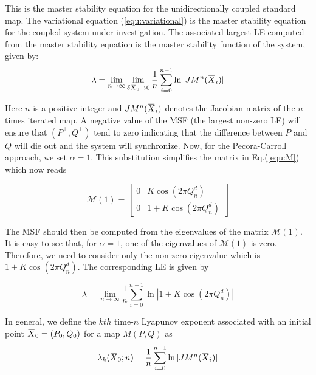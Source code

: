\documentclass[preprint,showpacs,preprintnumbers,amsmath,amssymb]{revtex4-1}
\newcommand{\overbar}[1]{\mkern 1.5mu\overline{\mkern-1.5mu#1\mkern-1.5mu}\mkern 1.5mu}
\begin{document}
This is the master stability equation for the unidirectionally coupled standard map. The variational equation (\ref{equ:variational}) is the master stability equation for the coupled system under investigation. The associated largest LE computed from the master stability equation is the master stability function of the system, given by:
\begin{equation}
\label{equ:msf}
\lambda  = \lim_{n \rightarrow \infty} \lim_{\delta\overbar{X}_0\rightarrow 0}\frac{1}{n}\sum^{n-1}_{i=0}\ln|JM^n(\overbar{X}_i)|
\end{equation}

Here $n$ is a positive integer and $JM^n(\overbar{X}_i)$ denotes the Jacobian matrix of the $n$-times iterated map.  A negative value of the MSF (the largest non-zero LE) will ensure that $(P^\perp,Q^\perp) $ tend to zero indicating that the difference between $P$ and $Q$ will die out and the system will synchronize. 
Now, for the Pecora-Carroll approach, we set $\alpha = 1$. This substitution simplifies the matrix in Eq.(\ref{equ:M}) which now reads

\begin{equation} 
\mathcal{M}(1)= \begin{bmatrix} 0 & K\cos(2\pi Q^d_n) \\ 0 & 1 + K\cos(2\pi Q^d_n) \end{bmatrix} 
\end{equation}

The MSF should then be computed from the eigenvalues of the matrix $\mathcal{M}(1)$. It is easy to see that, for $\alpha =1$, one of the eigenvalues of   $\mathcal{M}(1)$ is zero. Therefore, we need to consider only the non-zero eigenvalue which is $1+K\cos(2\pi Q^d_n)$. The corresponding LE is given by

\begin{equation}
\label{equ:LE}
\lambda   = \lim_{n \rightarrow \infty} \frac{1}{n}\sum^{n-1}_{i=0}\ln|1+K\cos(2\pi Q^d_n)|
\end{equation}

In general, we define the $kth$ time-$n$ Lyapunov exponent associated with an initial point $\overbar{X}_0 = (P_0,Q_0)$ for a map $M(P,Q)$ as
\begin{equation}
\label{equ:FLEf}
\lambda _k(\overbar{X}_0;n)  = \frac{1}{n}\sum^{n-1}_{i=0}\ln|JM^n(\overbar{X}_i)|
\end{equation}
\end{document}

